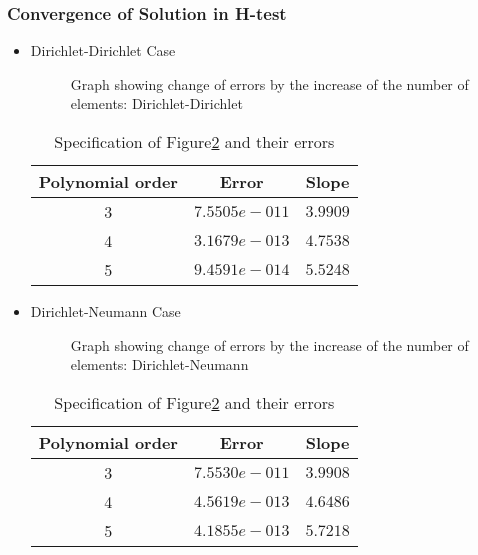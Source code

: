 \clearpage

\subsubsection{Convergence of Solution in H-test}


\begin{itemize}

\item Dirichlet-Dirichlet Case
\begin{figure}[h]
\begin{center}
\caption{\label{ScrvHconv}Graph showing change of errors by the
increase of the number of elements: Dirichlet-Dirichlet}
\end{center}
\end{figure}

\begin{table}[h]
\centering \caption{\label{ScrvHconvt} Specification of
                              Figure\ref{ScrvHconv} and their errors}
\begin{tabular}{|c|c|c|} \hline
Polynomial order&Error&Slope   \\ \hline \hline
    3&$7.5505e-011$ &$3.9909$ \\ \hline
    4&$3.1679e-013$ &$4.7538$ \\ \hline
    5&$9.4591e-014$ &$5.5248$ \\ \hline
\end{tabular}
\end{table}


\item Dirichlet-Neumann Case

\begin{figure}[h]
\begin{center}
\caption{\label{ScrvHconv}Graph showing change of errors by the
increase of the number of elements: Dirichlet-Neumann}
\end{center}
\end{figure}

\begin{table}[h]
\centering \caption{\label{ScrvHconvt} Specification of
                              Figure\ref{ScrvHconv} and their errors}
\begin{tabular}{|c|c|c|} \hline
Polynomial order&Error&Slope   \\ \hline \hline
    3&$7.5530e-011$ &$3.9908$ \\ \hline
    4&$4.5619e-013$ &$4.6486$ \\ \hline
    5&$4.1855e-013$ &$5.7218$ \\ \hline
\end{tabular}

\end{table}


\end{itemize}

